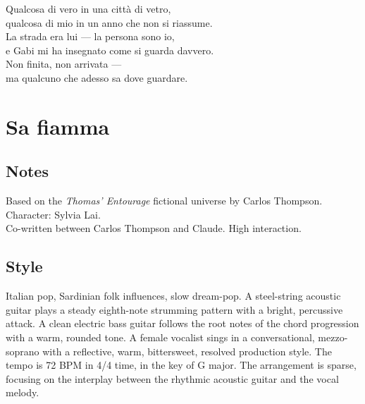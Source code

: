 \begin{lyrics}
Qualcosa di vero in una città di vetro,\\
qualcosa di mio in un anno che non si riassume.\\
La strada era lui — la persona sono io,\\
e Gabi mi ha insegnato come si guarda davvero.\\
Non finita, non arrivata —\\
ma qualcuno che adesso sa dove guardare.

\end{lyrics}

\section{Sa fiamma}

\subsection{Notes}
Based on the \emph{Thomas' Entourage} fictional universe by Carlos Thompson.\\
Character: Sylvia Lai.\\
Co-written between Carlos Thompson and Claude. High interaction.

\subsection{Style}
Italian pop, Sardinian folk influences, slow dream-pop. A steel-string acoustic guitar plays a steady eighth-note strumming pattern with a bright, percussive attack. A clean electric bass guitar follows the root notes of the chord progression with a warm, rounded tone. A female vocalist sings in a conversational, mezzo-soprano with a reflective, warm, bittersweet, resolved production style. The tempo is 72 BPM in 4/4 time, in the key of G major. The arrangement is sparse, focusing on the interplay between the rhythmic acoustic guitar and the vocal melody.

